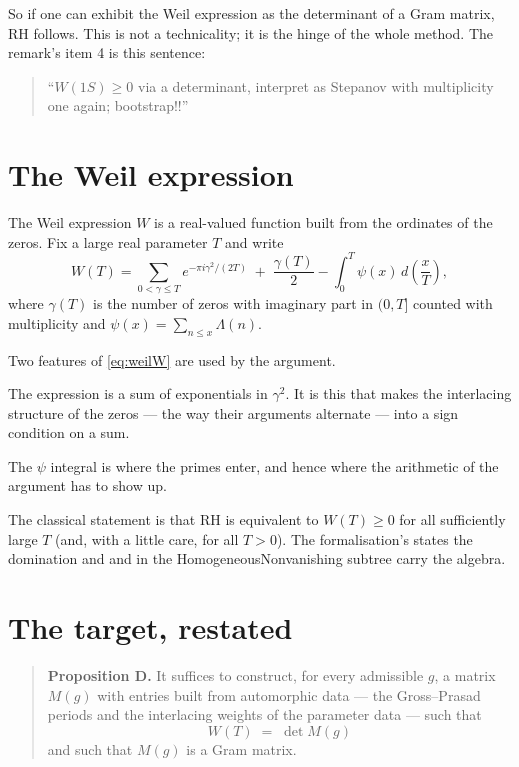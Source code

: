 So if one can exhibit the Weil expression as the determinant of a Gram matrix,
RH follows. This is not a technicality; it is the hinge of the whole method.
The remark's item 4 is this sentence:

\begin{quote}
\small
``$W(1S) \ge 0$ via a determinant, interpret as Stepanov with multiplicity one
again; bootstrap!!''
\end{quote}

\section{The Weil expression}The Weil expression $W$ is a real-valued function built from the ordinates of
the zeros. Fix a large real parameter $T$ and write
\begin{equation}
W(T) = \sum_{0 < \gamma \le T} e^{-\pi i \gamma^2 / (2T)} \;+\;
\frac{\gamma(T)}{2} - \int_0^T \psi(x)\,d\!\left(\frac{x}{T}\right),
\label{eq:weilW}
\end{equation}
where $\gamma(T)$ is the number of zeros with imaginary part in $(0, T]$
counted with multiplicity and $\psi(x) = \sum_{n \le x}\Lambda(n)$.

Two features of \eqref{eq:weilW} are used by the argument.

\begin{description}[style=nextline,leftmargin=0pt,labelwidth=0pt,labelsep=0pt,font=\sffamily\bfseries\small,
  itemsep=6pt]
\item[The zeros appear through their ordinates only.] The expression is a sum
of exponentials in $\gamma^2$. It is this that makes the interlacing
structure of the zeros --- the way their arguments alternate --- into a
sign condition on a sum.
\item[The main term is $\int \psi$.] The $\psi$ integral is where the primes
enter, and hence where the arithmetic of the argument has to show up.
\end{description}

The classical statement is that RH is equivalent to $W(T) \ge 0$ for all
sufficiently large $T$ (and, with a little care, for all $T > 0$). The
formalisation's  states the domination and 
and  in the HomogeneousNonvanishing subtree
carry the algebra.

\section{The target, restated}\begin{quote}
\textbf{Proposition D.} It suffices to construct, for every admissible $g$, a
matrix $M(g)$ with entries built from automorphic data --- the Gross--Prasad
periods and the interlacing weights of the parameter data --- such that
\[
W(T) \;=\; \det M(g)
\]
and such that $M(g)$ is a Gram matrix.
\end{quote}

